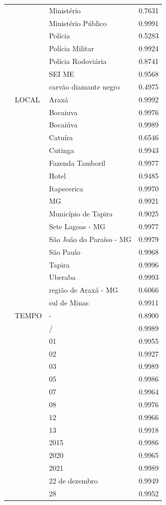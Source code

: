 \begin{table}
\begin{tabular}{llp{6cm}r}
 &  & Ministério & 0.7631 \\
 &  & Ministério Público & 0.9991 \\
 &  & Polícia & 0.5283 \\
 &  & Polícia Militar & 0.9924 \\
 &  & Polícia Rodoviária & 0.8741 \\
 &  & SEI ME & 0.9568 \\
 &  & carvão diamante negro & 0.4975 \\
 & LOCAL & Araxá & 0.9992 \\
 &  & Bocaiuva & 0.9976 \\
 &  & Bocaiúva & 0.9989 \\
 &  & Catuíra & 0.6546 \\
 &  & Cutinga & 0.9943 \\
 &  & Fazenda Tamboril & 0.9977 \\
 &  & Hotel & 0.9485 \\
 &  & Itapecerica & 0.9970 \\
 &  & MG & 0.9921 \\
 &  & Município de Tapira & 0.9025 \\
 &  & Sete Lagoas - MG & 0.9977 \\
 &  & São João do Paraíso - MG & 0.9979 \\
 &  & São Paulo & 0.9968 \\
 &  & Tapira & 0.9996 \\
 &  & Uberaba & 0.9993 \\
 &  & região de Araxá - MG & 0.6066 \\
 &  & sul de Minas & 0.9911 \\
 & TEMPO & - & 0.8900 \\
 &  & / & 0.9989 \\
 &  & 01 & 0.9955 \\
 &  & 02 & 0.9927 \\
 &  & 03 & 0.9989 \\
 &  & 05 & 0.9986 \\
 &  & 07 & 0.9964 \\
 &  & 08 & 0.9976 \\
 &  & 12 & 0.9966 \\
 &  & 13 & 0.9918 \\
 &  & 2015 & 0.9986 \\
 &  & 2020 & 0.9965 \\
 &  & 2021 & 0.9989 \\
 &  & 22 de dezembro & 0.9949 \\
 &  & 28 & 0.9952 \\

\end{tabular}
\end{table}
